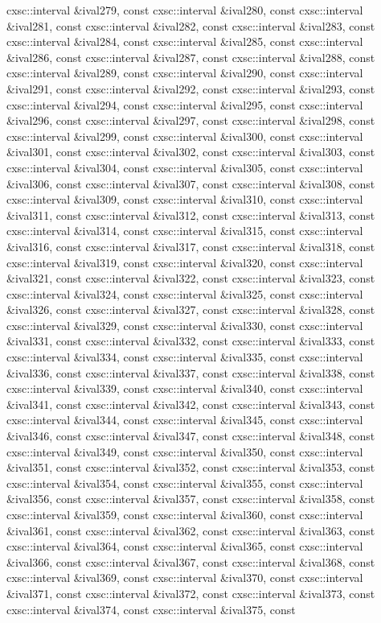 \begin{DoxyCompactItemize}
cxsc\-::interval \&ival279, const cxsc\-::interval \&ival280, const cxsc\-::interval \&ival281, const cxsc\-::interval \&ival282, const cxsc\-::interval \&ival283, const cxsc\-::interval \&ival284, const cxsc\-::interval \&ival285, const cxsc\-::interval \&ival286, const cxsc\-::interval \&ival287, const cxsc\-::interval \&ival288, const cxsc\-::interval \&ival289, const cxsc\-::interval \&ival290, const cxsc\-::interval \&ival291, const cxsc\-::interval \&ival292, const cxsc\-::interval \&ival293, const cxsc\-::interval \&ival294, const cxsc\-::interval \&ival295, const cxsc\-::interval \&ival296, const cxsc\-::interval \&ival297, const cxsc\-::interval \&ival298, const cxsc\-::interval \&ival299, const cxsc\-::interval \&ival300, const cxsc\-::interval \&ival301, const cxsc\-::interval \&ival302, const cxsc\-::interval \&ival303, const cxsc\-::interval \&ival304, const cxsc\-::interval \&ival305, const cxsc\-::interval \&ival306, const cxsc\-::interval \&ival307, const cxsc\-::interval \&ival308, const cxsc\-::interval \&ival309, const cxsc\-::interval \&ival310, const cxsc\-::interval \&ival311, const cxsc\-::interval \&ival312, const cxsc\-::interval \&ival313, const cxsc\-::interval \&ival314, const cxsc\-::interval \&ival315, const cxsc\-::interval \&ival316, const cxsc\-::interval \&ival317, const cxsc\-::interval \&ival318, const cxsc\-::interval \&ival319, const cxsc\-::interval \&ival320, const cxsc\-::interval \&ival321, const cxsc\-::interval \&ival322, const cxsc\-::interval \&ival323, const cxsc\-::interval \&ival324, const cxsc\-::interval \&ival325, const cxsc\-::interval \&ival326, const cxsc\-::interval \&ival327, const cxsc\-::interval \&ival328, const cxsc\-::interval \&ival329, const cxsc\-::interval \&ival330, const cxsc\-::interval \&ival331, const cxsc\-::interval \&ival332, const cxsc\-::interval \&ival333, const cxsc\-::interval \&ival334, const cxsc\-::interval \&ival335, const cxsc\-::interval \&ival336, const cxsc\-::interval \&ival337, const cxsc\-::interval \&ival338, const cxsc\-::interval \&ival339, const cxsc\-::interval \&ival340, const cxsc\-::interval \&ival341, const cxsc\-::interval \&ival342, const cxsc\-::interval \&ival343, const cxsc\-::interval \&ival344, const cxsc\-::interval \&ival345, const cxsc\-::interval \&ival346, const cxsc\-::interval \&ival347, const cxsc\-::interval \&ival348, const cxsc\-::interval \&ival349, const cxsc\-::interval \&ival350, const cxsc\-::interval \&ival351, const cxsc\-::interval \&ival352, const cxsc\-::interval \&ival353, const cxsc\-::interval \&ival354, const cxsc\-::interval \&ival355, const cxsc\-::interval \&ival356, const cxsc\-::interval \&ival357, const cxsc\-::interval \&ival358, const cxsc\-::interval \&ival359, const cxsc\-::interval \&ival360, const cxsc\-::interval \&ival361, const cxsc\-::interval \&ival362, const cxsc\-::interval \&ival363, const cxsc\-::interval \&ival364, const cxsc\-::interval \&ival365, const cxsc\-::interval \&ival366, const cxsc\-::interval \&ival367, const cxsc\-::interval \&ival368, const cxsc\-::interval \&ival369, const cxsc\-::interval \&ival370, const cxsc\-::interval \&ival371, const cxsc\-::interval \&ival372, const cxsc\-::interval \&ival373, const cxsc\-::interval \&ival374, const cxsc\-::interval \&ival375, const 
\end{DoxyCompactItemize}
